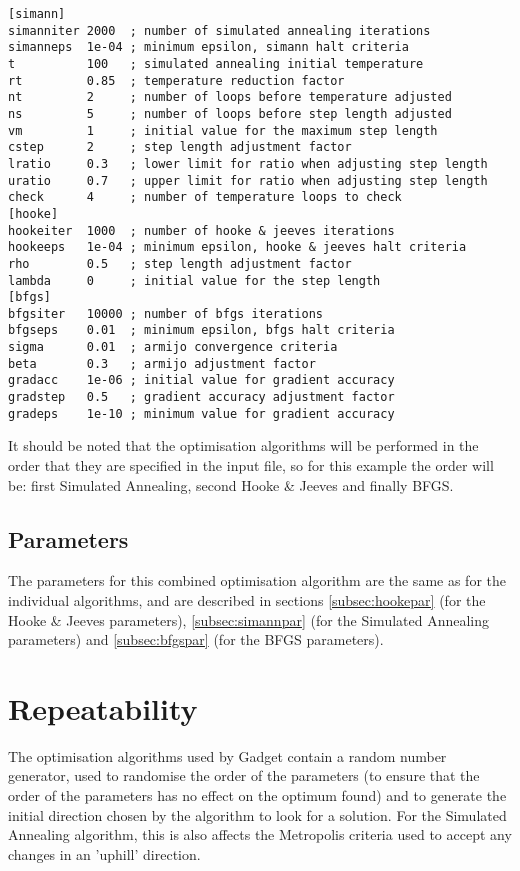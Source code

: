 \documentclass[10pt,twoside]{book}
\begin{document}
{\small\begin{verbatim}
[simann]
simanniter 2000  ; number of simulated annealing iterations
simanneps  1e-04 ; minimum epsilon, simann halt criteria
t          100   ; simulated annealing initial temperature
rt         0.85  ; temperature reduction factor
nt         2     ; number of loops before temperature adjusted
ns         5     ; number of loops before step length adjusted
vm         1     ; initial value for the maximum step length
cstep      2     ; step length adjustment factor
lratio     0.3   ; lower limit for ratio when adjusting step length
uratio     0.7   ; upper limit for ratio when adjusting step length
check      4     ; number of temperature loops to check
[hooke]
hookeiter  1000  ; number of hooke & jeeves iterations
hookeeps   1e-04 ; minimum epsilon, hooke & jeeves halt criteria
rho        0.5   ; step length adjustment factor
lambda     0     ; initial value for the step length
[bfgs]
bfgsiter   10000 ; number of bfgs iterations
bfgseps    0.01  ; minimum epsilon, bfgs halt criteria
sigma      0.01  ; armijo convergence criteria
beta       0.3   ; armijo adjustment factor
gradacc    1e-06 ; initial value for gradient accuracy
gradstep   0.5   ; gradient accuracy adjustment factor
gradeps    1e-10 ; minimum value for gradient accuracy
\end{verbatim}}

It should be noted that the optimisation algorithms will be performed in the order that they are specified in the input file, so for this example the order will be: first Simulated Annealing, second Hooke \& Jeeves and finally BFGS.

\subsection{Parameters}\label{subsec:combinepar}
The parameters for this combined optimisation algorithm are the same as for the individual algorithms, and are described in sections \ref{subsec:hookepar} (for the Hooke \& Jeeves parameters), \ref{subsec:simannpar} (for the Simulated Annealing parameters) and \ref{subsec:bfgspar} (for the BFGS parameters).

\section{Repeatability}\label{sec:repeat}
The optimisation algorithms used by Gadget contain a random number generator, used to randomise the order of the parameters (to ensure that the order of the parameters has no effect on the optimum found) and to generate the initial direction chosen by the algorithm to look for a solution.  For the Simulated Annealing algorithm, this is also affects the Metropolis criteria used to accept any changes in an 'uphill' direction.
\end{document}
